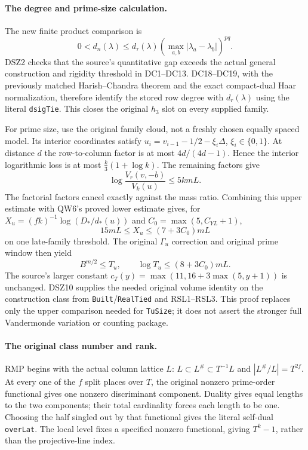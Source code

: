\paragraph{The degree and prime-size calculation.}
The new finite product comparison is
\[
 0<d_n(\lambda)\le d_\tau(\lambda)
         \left(\max_{a,b}|\lambda_a-\lambda_b|\right)^{pq}.
                                                               \tag{AU32.2}
\]
DSZ2 checks that the source's quantitative gap exceeds the actual
general construction and rigidity threshold in DC1--DC13. DC18--DC19,
with the previously matched Harish--Chandra theorem and the exact
compact-dual Haar normalization, therefore identify the stored row
degree with $d_r(\lambda)$ using the literal \texttt{dsigTie}.
This closes the original $h_3$ slot on every supplied family.

For prime size, use the original family cloud, not a freshly chosen
equally spaced model. Its interior coordinates satisfy
$u_i=v_{i-1}-1/2-\xi_i\Delta$, $\xi_i\in\{0,1\}$.
At distance $d$ the row-to-column factor is at most
$4d/(4d-1)$. Hence the interior logarithmic loss is at most
$\frac{k}{3}(1+\log k)$. The remaining factors give
\[
 \log\frac{V_r(v,-b)}{V_k(u)}\le5kmL.
                                                               \tag{AU32.3}
\]
The factorial factors cancel exactly against the mass ratio.
Combining this upper estimate with QW6's proved lower estimate gives,
for $X_u=(fk)^{-1}\log(D_*/d_*(u))$ and
$C_0=\max(5,C_{YL}+1)$,
\[
 15mL\le X_u\le(7+3C_0)mL
                                                               \tag{AU32.4}
\]
on one late-family threshold. The original $\Gamma_u$ correction
and original prime window then yield
\[
 B^{m/2}\le T_u,\qquad
 \log T_u\le(8+3C_0)mL.
                                                               \tag{AU32.5}
\]
The source's larger constant
$c_T(y)=\max(11,16+3\max(5,y+1))$ is unchanged.
DSZ10 supplies the needed original volume identity on the construction
class from \texttt{Built}/\texttt{RealTied} and RSL1--RSL3.
This proof replaces only the upper comparison needed for
\texttt{TuSize}; it does not assert the stronger full Vandermonde
variation or counting package.

\paragraph{The original class number and rank.}
RMP begins with the actual column lattice $L$:
$L\subset L^\#\subset T^{-1}L$ and $|L^\#/L|=T^{2f}$.
At every one of the $f$ split places over $T$, the original nonzero
prime-order functional gives one nonzero discriminant component.
Duality gives equal lengths to the two components; their total
cardinality forces each length to be one. Choosing the half singled
out by that functional gives the literal self-dual \texttt{overLat}.
The local level fixes a specified nonzero functional, giving
$T^k-1$, rather than the projective-line index.

